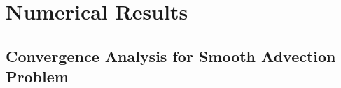 \documentclass[]{article}
\begin{document}
%
%        
%        
%
%
%        
%
%

\section{Numerical Results}

    \subsection*{Convergence Analysis for Smooth Advection Problem}
\end{document}
